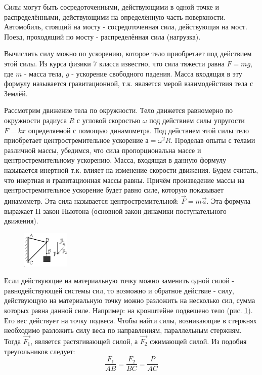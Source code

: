 \documentclass[a5paper, 10pt]{diss_4}
\renewcommand{\'}{\,'}
\begin{document}
  Силы могут быть сосредоточенными, действующими в одной точке и
распределёнными, действующими на определённую часть поверхности. Автомобиль,
стоящий на мосту - сосредоточенная сила, действующая на мост. Поезд, проходящий
по мосту - распределённая сила (нагрузка).

  Вычислить силу можно по ускорению, которое тело приобретает под действием
этой силы. Из курса физики 7 класса известно, что сила тяжести равна $F=mg$,
где $m$ - масса тела, $g$ - ускорение свободного падения. Масса входящая в
эту формулу называется гравитационной, т.к. является мерой взаимодействия
тела с Землёй.

  Рассмотрим движение тела по окружности. Тело движется равномерно по
окружности радиуса $R$ с угловой скоростью $\omega$ под действием силы
упругости $F=kx$ определяемой с помощью динамометра. Под действием этой силы
тело приобретает центростремительное ускорение $а=\omega^2R$. Проделав опыты с
 телами различной массы, убедимся, что сила пропорциональна массе и
центростремительному ускорению. Масса, входящая в данную формулу называется
инертной т.к. влияет на изменение скорости движения. Будем считать, что
инертная и гравитационная массы равны. Причём произведение массы на
центростремительное ускорение будет равно силе, которую показывает
динамометр. Эта сила называется центростремительной: $\vec{F}=m\vec{a}$. Эта
формула выражает II закон Ньютона (основной закон динамики поступательного
движения).

\begin{figure}
\includegraphics[width=0.2\textwidth]{img/ris_26.eps}
\caption{}
\label{r26}
\end{figure}
  Если действующие на материальную точку можно заменить одной силой -
равнодействующей системы сил, то возможно и обратное действие - силу,
действующую на материальную точку можно разложить на несколько сил, сумма
которых равна данной силе. Например: на кронштейне подвешено тело (рис. \ref{r26}). Его вес
действует на точку подвеса. Чтобы найти силы, возникающие в стержнях необходимо
разложить силу веса по направлениям, параллельным стержням. Тогда $\vec{F_1}$, является
растягивающей силой, а $\vec{F_2}$ сжимающей силой. Из подобия треугольников следует:
\[
\frac{F_1}{AB}=\frac{F_2}{BC}=\frac{P}{AC}
\]
\end{document}
